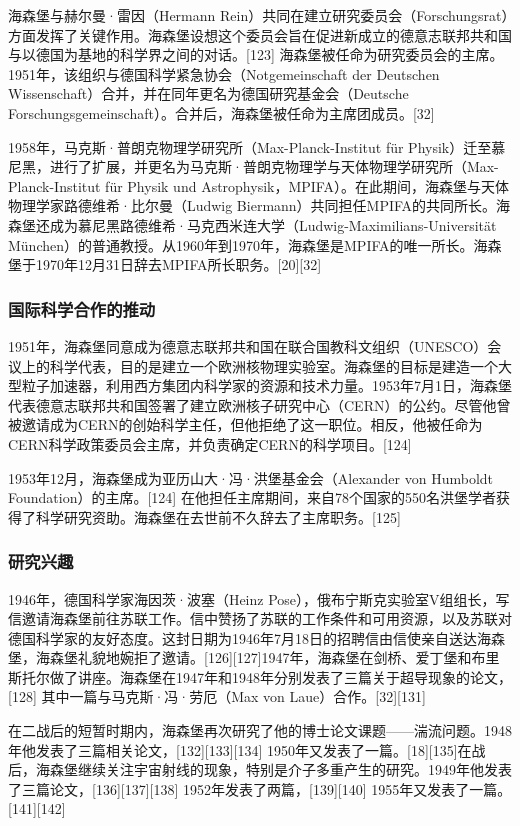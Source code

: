 海森堡与赫尔曼·雷因（Hermann Rein）共同在建立研究委员会（Forschungsrat）方面发挥了关键作用。海森堡设想这个委员会旨在促进新成立的德意志联邦共和国与以德国为基地的科学界之间的对话。[123] 海森堡被任命为研究委员会的主席。1951年，该组织与德国科学紧急协会（Notgemeinschaft der Deutschen Wissenschaft）合并，并在同年更名为德国研究基金会（Deutsche Forschungsgemeinschaft）。合并后，海森堡被任命为主席团成员。[32]

1958年，马克斯·普朗克物理学研究所（Max-Planck-Institut für Physik）迁至慕尼黑，进行了扩展，并更名为马克斯·普朗克物理学与天体物理学研究所（Max-Planck-Institut für Physik und Astrophysik，MPIFA）。在此期间，海森堡与天体物理学家路德维希·比尔曼（Ludwig Biermann）共同担任MPIFA的共同所长。海森堡还成为慕尼黑路德维希·马克西米连大学（Ludwig-Maximilians-Universität München）的普通教授。从1960年到1970年，海森堡是MPIFA的唯一所长。海森堡于1970年12月31日辞去MPIFA所长职务。[20][32]
\subsubsection{国际科学合作的推动}  
1951年，海森堡同意成为德意志联邦共和国在联合国教科文组织（UNESCO）会议上的科学代表，目的是建立一个欧洲核物理实验室。海森堡的目标是建造一个大型粒子加速器，利用西方集团内科学家的资源和技术力量。1953年7月1日，海森堡代表德意志联邦共和国签署了建立欧洲核子研究中心（CERN）的公约。尽管他曾被邀请成为CERN的创始科学主任，但他拒绝了这一职位。相反，他被任命为CERN科学政策委员会主席，并负责确定CERN的科学项目。[124]

1953年12月，海森堡成为亚历山大·冯·洪堡基金会（Alexander von Humboldt Foundation）的主席。[124] 在他担任主席期间，来自78个国家的550名洪堡学者获得了科学研究资助。海森堡在去世前不久辞去了主席职务。[125]
\subsubsection{研究兴趣}  
1946年，德国科学家海因茨·波塞（Heinz Pose），俄布宁斯克实验室V组组长，写信邀请海森堡前往苏联工作。信中赞扬了苏联的工作条件和可用资源，以及苏联对德国科学家的友好态度。这封日期为1946年7月18日的招聘信由信使亲自送达海森堡，海森堡礼貌地婉拒了邀请。[126][127]1947年，海森堡在剑桥、爱丁堡和布里斯托尔做了讲座。海森堡在1947年和1948年分别发表了三篇关于超导现象的论文，[128] 其中一篇与马克斯·冯·劳厄（Max von Laue）合作。[32][131]  

在二战后的短暂时期内，海森堡再次研究了他的博士论文课题——湍流问题。1948年他发表了三篇相关论文，[132][133][134] 1950年又发表了一篇。[18][135]在战后，海森堡继续关注宇宙射线的现象，特别是介子多重产生的研究。1949年他发表了三篇论文，[136][137][138] 1952年发表了两篇，[139][140] 1955年又发表了一篇。[141][142]

